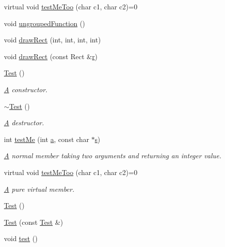 \begin{DoxyCompactItemize}
\item 
virtual void \hyperlink{class_test_ada2b629a324d987f40de6e72196526a5}{test\+Me\+Too} (char c1, char c2)=0
\item 
void \hyperlink{class_test_ae3d5d66760866dc4caf371ccef859ba6}{ungrouped\+Function} ()
\item 
void \hyperlink{class_test_a6b16f6be500388342845646c1969d3aa}{draw\+Rect} (int, int, int, int)
\item 
void \hyperlink{class_test_aadf47113ad9dcd5600cb22e3bcff5258}{draw\+Rect} (const Rect \&\hyperlink{060__command__switch_8tcl_a0a0bd3dc69dd06934c4e6362155e0ace}{r})
\item 
\hyperlink{class_test_a44e3a28c552193de099601e2910531f1}{Test} ()
\begin{DoxyCompactList}\small\item\em \hyperlink{class_a}{A} constructor. \end{DoxyCompactList}\item 
\hyperlink{class_test_a31b169208ad4fc5344a7b6b8e1fd00c1}{$\sim$\+Test} ()
\begin{DoxyCompactList}\small\item\em \hyperlink{class_a}{A} destructor. \end{DoxyCompactList}\item 
int \hyperlink{class_test_ab89e4a0d841b51185817c5c7ae739ea4}{test\+Me} (int \hyperlink{060__command__switch_8tcl_ab08ae027fc5777bc4f0629f1b60b35db}{a}, const char $\ast$\hyperlink{060__command__switch_8tcl_a011c73f2dbb87635a3b4206c72355f6e}{s})
\begin{DoxyCompactList}\small\item\em \hyperlink{class_a}{A} normal member taking two arguments and returning an integer value. \end{DoxyCompactList}\item 
virtual void \hyperlink{class_test_ada2b629a324d987f40de6e72196526a5}{test\+Me\+Too} (char c1, char c2)=0
\begin{DoxyCompactList}\small\item\em \hyperlink{class_a}{A} pure virtual member. \end{DoxyCompactList}\item 
\hyperlink{class_test_a44e3a28c552193de099601e2910531f1}{Test} ()
\item 
\hyperlink{class_test_adcf1bc755df94c4d07519c0a02aa1cc0}{Test} (const \hyperlink{class_test}{Test} \&)
\item 
void \hyperlink{class_test_a4cb7b5dcc0c62cea42975109dcd9208b}{test} ()

\end{DoxyCompactItemize}
